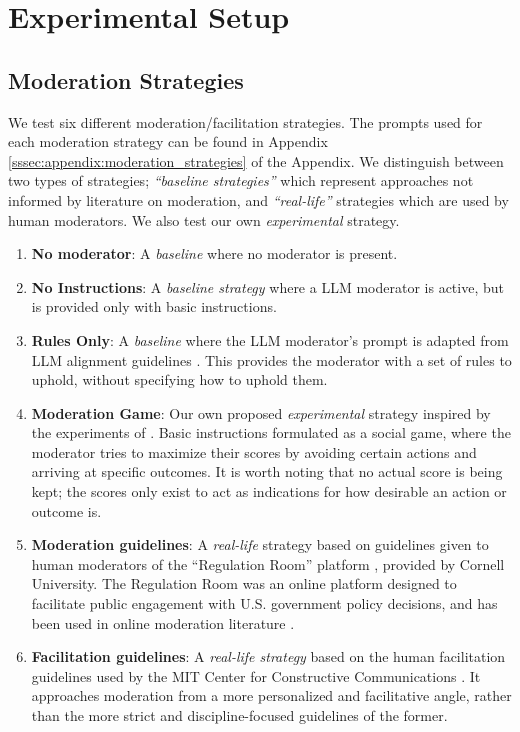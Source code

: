 \section{Experimental Setup}
\label{sec:experimental}

\subsection{Moderation Strategies}
\label{ssec:experimental:strategies}

We test six different moderation/facilitation strategies. The prompts used for each moderation strategy can be found in Appendix \ref{sssec:appendix:moderation_strategies} of the Appendix. We distinguish between two types of strategies; \emph{“baseline strategies”} which represent approaches not informed by literature on moderation, and \emph{“real-life”} strategies which are used by human moderators. We also test our own \emph{experimental} strategy.

\begin{enumerate}[noitemsep]
    \item \textbf{No moderator}: A \emph{baseline} where no moderator is present.

    \item \textbf{No Instructions}: A \emph{baseline strategy} where a \ac{LLM} moderator is active, but is provided only with basic instructions.

    \item \textbf{Rules Only}: A \emph{baseline} where the \ac{LLM} moderator's prompt is adapted from \ac{LLM} alignment guidelines \cite{collective_constitution}. This provides the moderator with a set of rules to uphold, without specifying how to uphold them.
    
    \item \textbf{Moderation Game}: Our own proposed \emph{experimental} strategy inspired by the experiments of \citet{abdelnabi_negotiations}. Basic instructions formulated as a social game, where the moderator tries to maximize their scores by avoiding certain actions and arriving at specific outcomes. It is worth noting that no actual score is being kept; the scores only exist to act as indications for how desirable an action or outcome is. 

    \item \textbf{Moderation guidelines}: A \emph{real-life} strategy based on guidelines given to human moderators of the “Regulation Room” platform \citep{Cornell_eRulemaking2017}, provided by Cornell University. The Regulation Room was an online platform designed to facilitate public engagement with U.S. government policy decisions, and has been used in online moderation literature \cite{seering_self_moderation, park_et_al_2012_facilitation}.

    \item \textbf{Facilitation guidelines}: A \emph{real-life strategy} based on the human facilitation guidelines used by the MIT Center for Constructive Communications \cite{dimitra-book}. It approaches moderation from a more personalized and facilitative angle, rather than the more strict and discipline-focused guidelines of the former.
\end{enumerate}


